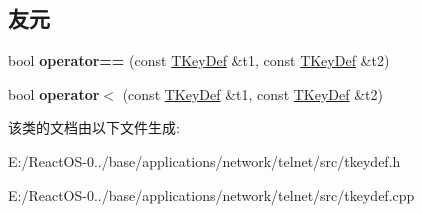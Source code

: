 \subsection*{友元}
\begin{DoxyCompactItemize}
\item 
\mbox{\label{class_t_key_def_abc9cdb756bc8a72331e1058e63cfd557}} 
bool {\bfseries operator==} (const \hyperlink{class_t_key_def}{T\+Key\+Def} \&t1, const \hyperlink{class_t_key_def}{T\+Key\+Def} \&t2)
\item 
\mbox{\label{class_t_key_def_a584e75961cb07d6a65e48abf374c4f0e}} 
bool {\bfseries operator$<$} (const \hyperlink{class_t_key_def}{T\+Key\+Def} \&t1, const \hyperlink{class_t_key_def}{T\+Key\+Def} \&t2)
\end{DoxyCompactItemize}


该类的文档由以下文件生成\+:\begin{DoxyCompactItemize}
\item 
E\+:/\+React\+O\+S-\/0../base/applications/network/telnet/src/tkeydef.\+h\item 
E\+:/\+React\+O\+S-\/0../base/applications/network/telnet/src/tkeydef.\+cpp\end{DoxyCompactItemize}
